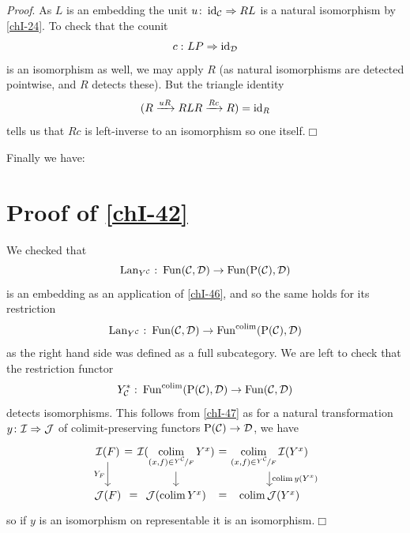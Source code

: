         \emph{Proof}. As $L$ is an embedding the unit $u \colon \operatorname{id}_{\mathcal{C}} \Rightarrow RL$ is a natural isomorphism by \ref{chI-24}. To check that the counit
        \begin{equation*}
            c \,\colon LP \Rightarrow \operatorname{id}_{\mathcal{D}}
        \end{equation*}
        is an isomorphism as well, we may apply $R$ (as natural isomorphisms are detected pointwise, and $R$ detects these). But the triangle identity  
        \begin{equation*}
            (R \xrightarrow{uR} RLR \xrightarrow{Rc} R) = \operatorname{id}_R
        \end{equation*}
        tells us that $Rc$ is left-inverse to an isomorphism so one itself.\hfill$\Box$
        \medskip

        Finally we have:
    \section{Proof of \ref{chI-42}}
        We checked that
        \begin{equation*}
            \operatorname{Lan}_{Y^{\mathcal{C}}} \,\colon \operatorname{Fun}(\mathcal{C}, \mathcal{D}) \to \operatorname{Fun}(\mathrm{P}(\mathcal{C}), \mathcal{D})
        \end{equation*}
        is an embedding as an application of \ref{chI-46}, and so the same holds for its restriction
        \begin{equation*}
            \operatorname{Lan}_{Y^{\mathcal{C}}} \,\colon \operatorname{Fun}(\mathcal{C}, \mathcal{D}) \to \operatorname{Fun}^{\operatorname*{colim}}(\mathrm{P}(\mathcal{C}), \mathcal{D})
        \end{equation*}
        as the right hand side was defined as a full subcategory. We are left to check that the restriction functor
        \begin{equation*}
            Y^*_{\mathcal{C}} \,\colon \operatorname{Fun}^{\operatorname*{colim}}(\mathrm{P}(\mathcal{C}), \mathcal{D}) \to \operatorname{Fun}(\mathcal{C}, \mathcal{D})
        \end{equation*}
        detects isomorphisms. This follows from \ref{chI-47} as for a natural transformation $y \colon \mathcal{I} \Rightarrow \mathcal{J}$ of colimit-preserving functors $\mathrm{P}(\mathcal{C}) \to \mathcal{D}$, we have
        \begin{equation*}
            \begin{tikzcd}[column sep=tiny, row sep=scriptsize]
                \Ii(F) \arrow[r, "=" description, phantom] \arrow[d, "Y_F"'] & {\Ii(\colim\limits_{(x,f) \in \nicefrac{Y^{\Cc}}{F}} Y^x)} \arrow[r, "=" description, phantom] \arrow[d] & {\colim\limits_{(x,f) \in \nicefrac{Y^{\Cc}}{F}} \Ii(Y^x)} \arrow[d, "\colim y(Y^x)"] \\
                \Jj(F) \arrow[r, "=" description, phantom]                   & \Jj(\colim Y^x) \arrow[r, "=" description, phantom]                                                            & \colim \Jj(Y^x)
            \end{tikzcd}
        \end{equation*}
        so if $y$ is an isomorphism on representable it is an isomorphism.\hfill$\Box$
